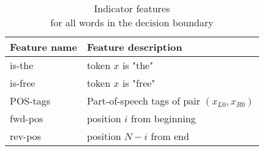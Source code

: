 \begin{table}[t]
 \caption{Indicator features\\for all words in the decision boundary}
 \label{table-indicator-features-bergsma-2007}
 \centering
 \small
 \begin{tabular}{@{}ll@{}}
  \toprule
  Feature name & Feature description \\
  \midrule
  is-the & token $x$ is "the"\\
  is-free & token $x$ is "free"\\
  POS-tags & Part-of-speech tags of pair $(x_{L0},x_{R0})$\\
  fwd-pos & position $i$ from beginning\\
  rev-pos & position $N-i$ from end\\
  \bottomrule
 \end{tabular}
\end{table}
